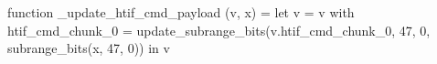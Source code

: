function _update_htif_cmd_payload (v, x) = let v = { v with htif_cmd_chunk_0 = update_subrange_bits(v.htif_cmd_chunk_0, 47, 0, subrange_bits(x, 47, 0)) } in
  v
